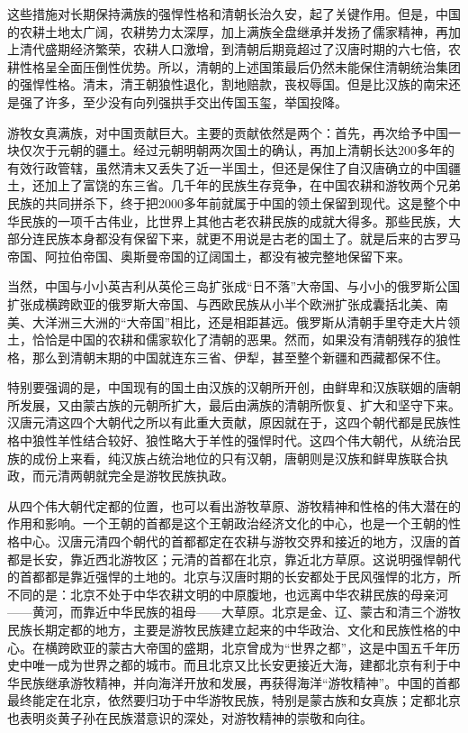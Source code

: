 \par 这些措施对长期保持满族的强悍性格和清朝长治久安，起了关键作用。但是，中国的农耕土地太广阔，农耕势力太深厚，加上满族全盘继承并发扬了儒家精神，再加上清代盛期经济繁荣，农耕人口激增，到清朝后期竟超过了汉唐时期的六七倍，农耕性格呈全面压倒性优势。所以，清朝的上述国策最后仍然未能保住清朝统治集团的强悍性格。清末，清王朝狼性退化，割地赔款，丧权辱国。但是比汉族的南宋还是强了许多，至少没有向列强拱手交出传国玉玺，举国投降。
\par 游牧女真满族，对中国贡献巨大。主要的贡献依然是两个：首先，再次给予中国一块仅次于元朝的疆土。经过元朝明朝两次国土的确认，再加上清朝长达200多年的有效行政管辖，虽然清末又丢失了近一半国土，但还是保住了自汉唐确立的中国疆土，还加上了富饶的东三省。几千年的民族生存竞争，在中国农耕和游牧两个兄弟民族的共同拼杀下，终于把2000多年前就属于中国的领土保留到现代。这是整个中华民族的一项千古伟业，比世界上其他古老农耕民族的成就大得多。那些民族，大部分连民族本身都没有保留下来，就更不用说是古老的国土了。就是后来的古罗马帝国、阿拉伯帝国、奥斯曼帝国的辽阔国土，都没有被完整地保留下来。
\par 当然，中国与小小英吉利从英伦三岛扩张成“日不落”大帝国、与小小的俄罗斯公国扩张成横跨欧亚的俄罗斯大帝国、与西欧民族从小半个欧洲扩张成囊括北美、南美、大洋洲三大洲的“大帝国”相比，还是相距甚远。俄罗斯从清朝手里夺走大片领土，恰恰是中国的农耕和儒家软化了清朝的恶果。然而，如果没有清朝残存的狼性格，那么到清朝末期的中国就连东三省、伊犁，甚至整个新疆和西藏都保不住。
\par 特别要强调的是，中国现有的国土由汉族的汉朝所开创，由鲜卑和汉族联姻的唐朝所发展，又由蒙古族的元朝所扩大，最后由满族的清朝所恢复、扩大和坚守下来。汉唐元清这四个大朝代之所以有此重大贡献，原因就在于，这四个朝代都是民族性格中狼性羊性结合较好、狼性略大于羊性的强悍时代。这四个伟大朝代，从统治民族的成份上来看，纯汉族占统治地位的只有汉朝，唐朝则是汉族和鲜卑族联合执政，而元清两朝就完全是游牧民族执政。
\par 从四个伟大朝代定都的位置，也可以看出游牧草原、游牧精神和性格的伟大潜在的作用和影响。一个王朝的首都是这个王朝政治经济文化的中心，也是一个王朝的性格中心。汉唐元清四个朝代的首都都定在农耕与游牧交界和接近的地方，汉唐的首都是长安，靠近西北游牧区；元清的首都在北京，靠近北方草原。这说明强悍朝代的首都都是靠近强悍的土地的。北京与汉唐时期的长安都处于民风强悍的北方，所不同的是：北京不处于中华农耕文明的中原腹地，也远离中华农耕民族的母亲河——黄河，而靠近中华民族的祖母——大草原。北京是金、辽、蒙古和清三个游牧民族长期定都的地方，主要是游牧民族建立起来的中华政治、文化和民族性格的中心。在横跨欧亚的蒙古大帝国的盛期，北京曾成为“世界之都”，这是中国五千年历史中唯一成为世界之都的城市。而且北京又比长安更接近大海，建都北京有利于中华民族继承游牧精神，并向海洋开放和发展，再获得海洋“游牧精神”。中国的首都最终能定在北京，依然要归功于中华游牧民族，特别是蒙古族和女真族；定都北京也表明炎黄子孙在民族潜意识的深处，对游牧精神的崇敬和向往。
